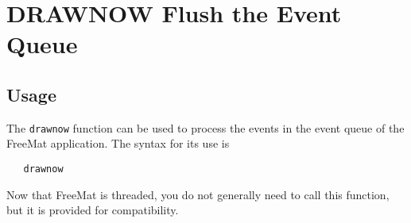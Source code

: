 \section{DRAWNOW Flush the Event Queue}

\subsection{Usage}

The \verb|drawnow| function can be used to process the events in the
event queue of the FreeMat application.  The syntax for its use
is
\begin{verbatim}
   drawnow
\end{verbatim}
Now that FreeMat is threaded, you do not generally need to call this
function, but it is provided for compatibility.
